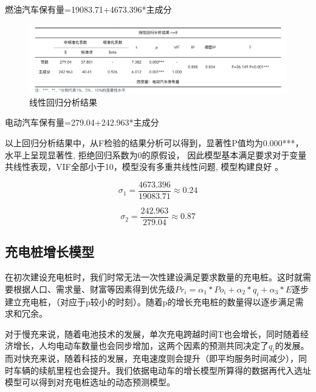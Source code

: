 \documentclass[12pt, a4paper, oneside]{ctexart}
\begin{document}
燃油汽车保有量=19083.71+4673.396*主成分


\begin{figure}[H]
  \centering
  \includegraphics[width=\textwidth]{pic/截屏2022-05-19 下午5.29.26.png}
  \caption{线性回归分析结果}
  \label{fig:线性回归分析结果2}
\end{figure}

电动汽车保有量=279.04+242.963*主成分

以上回归分析结果中，从F检验的结果分析可以得到，显著性P值均为0.000***，水平上呈现显著性,
拒绝回归系数为0的原假设，
因此模型基本满足要求对于变量共线性表现，VIF全部小于10，模型没有多重共线性问题,
模型构建良好 。

\begin{equation}
  \sigma_1=\frac{4673.396}{19083.71}\approx0.24
\end{equation}

\begin{equation}
  \sigma_2= \frac{242.963}{279.04} \approx0.87
\end{equation}


\subsection{充电桩增长模型}
在初次建设充电桩时，我们时常无法一次性建设满足要求数量的充电桩。这时就需要根据人口、需求量、财富等因素得到优先级\(Pr_i=\alpha_1*Po_i+\alpha_2*q_i+\alpha_3*E\)逐步建立充电桩，（对应于p较小的时刻）。随着p的增长充电桩的数量得以逐步满足需求和冗余。

对于慢充来说，随着电池技术的发展，单次充电跨越时间T也会增长，同时随着经济增长，人均电动车数量也会同步增加，这两个因素的预测共同决定了\(q_i\)的发展。而对快充来说，随着科技的发展，充电速度则会提升（即平均服务时间减少），同时车辆的续航里程也会提升。我们依据电动车的增长模型所算得的数据再代入选址模型可以得到对充电桩选址的动态预测模型。
\end{document}
